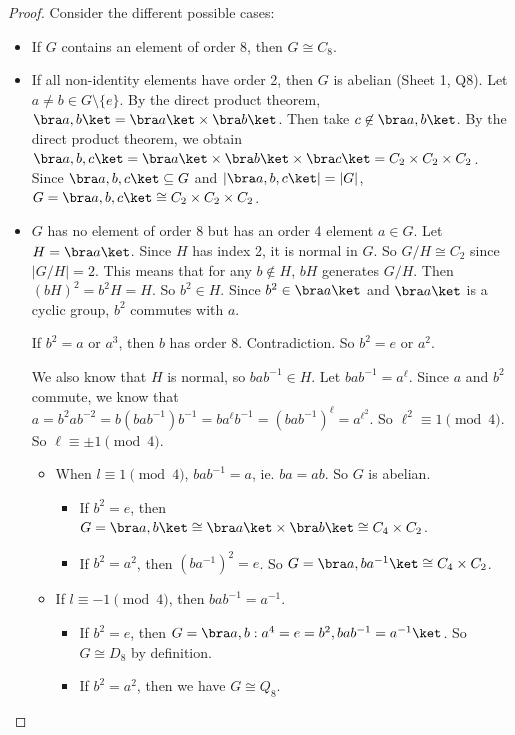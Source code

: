 \documentclass[a4paper]{article}
\begin{document}
\begin{proof}
  Consider the different possible cases:
  \begin{itemize}
    \item If $G$ contains an element of order 8, then $G\cong C_8$.
    \item If all non-identity elements have order 2, then $G$ is abelian (Sheet 1, Q8). Let $a\not= b\in G\setminus\{e\}$. By the direct product theorem, $\bra a, b\ket = \bra a\ket\times\bra b\ket$. Then take $c\not\in \bra a, b\ket$. By the direct product theorem, we obtain $\bra a, b, c\ket = \bra a\ket\times\bra b\ket\times\bra c\ket = C_2\times C_2\times C_2$. Since $\bra a, b, c\ket\subseteq G$ and $|\bra a, b, c\ket| = |G|$, $G = \bra a, b, c\ket \cong C_2\times C_2\times C_2$.
    \item $G$ has no element of order 8 but has an order 4 element $a\in G$. Let $H = \bra a\ket$. Since $H$ has index 2, it is normal in $G$. So $G/H \cong C_2$ since $|G/H| = 2$. This means that for any $b\not\in H$, $bH$ generates $G/H$. Then $(bH)^2 = b^2H = H$. So $b^2\in H$. Since $b^2\in \bra a\ket$ and $\bra a\ket$ is a cyclic group, $b^2$ commutes with $a$.

      If $b^2 = a$ or $a^3$, then $b$ has order 8. Contradiction. So $b^2 = e$ or $a^2$.

      We also know that $H$ is normal, so $bab^{-1}\in H$. Let $bab^{-1} = a^\ell$. Since $a$ and $b^2$ commute, we know that $a = b^2 ab^{-2} = b(bab^{-1})b^{-1} = ba^\ell b^{-1} = (bab^{-1})^{\ell} = a^{\ell^2}$. So $\ell^2 \equiv 1\pmod 4$. So $\ell \equiv \pm 1 \pmod 4$.

      \begin{itemize}
        \item When $l\equiv 1\pmod 4$, $bab^{-1} = a$, ie. $ba = ab$. So $G$ is abelian.
          \begin{itemize}
            \item If $b^2 = e$, then $G = \bra a, b\ket \cong \bra a\ket \times \bra b\ket \cong C_4\times C_2$.
            \item If $b^2 = a^2$, then $(ba^{-1})^2 = e$. So $G = \bra a, ba^{-1}\ket \cong C_4\times C_2$.
          \end{itemize}
        \item If $l \equiv -1\pmod 4$, then $bab^{-1} = a^{-1}$.
          \begin{itemize}
            \item If $b^2 = e$, then $G = \bra a, b: a^4 = e = b^2, bab^{-1} = a^{-1}\ket$. So $G\cong D_8$ by definition.
            \item If $b^2 = a^2$, then we have $G\cong Q_8$.
          \end{itemize}
      \end{itemize}
  \end{itemize}
\end{proof}
\end{document}
